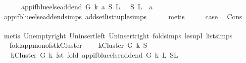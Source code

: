 \begin{isabellebody}
\ \ \ \ {\isacharbar}{\kern0pt}\ \ {\isachardoublequoteopen}{\isacharparenleft}{\kern0pt}app{\isacharunderscore}{\kern0pt}if{\isacharunderscore}{\kern0pt}blue{\isacharunderscore}{\kern0pt}else{\isacharunderscore}{\kern0pt}add{\isacharunderscore}{\kern0pt}end\ G\ k\ a\ {\isacharparenleft}{\kern0pt}S{\isacharcomma}{\kern0pt}\ L{}{\isacharparenright}{\kern0pt}{\isacharparenright}{\kern0pt}\ {\isacharequal}{\kern0pt}\ \ {\isacharparenleft}{\kern0pt}S{\isacharcomma}{\kern0pt}\ L{}\ {\isacharat}{\kern0pt}\ {\isacharbrackleft}{\kern0pt}a{\isacharbrackright}{\kern0pt}{\isacharparenright}{\kern0pt}{\isachardoublequoteclose}\isanewline
\ \ \ \ \isamarkupfalse%
\ app{\isacharunderscore}{\kern0pt}if{\isacharunderscore}{\kern0pt}blue{\isacharunderscore}{\kern0pt}else{\isacharunderscore}{\kern0pt}add{\isacharunderscore}{\kern0pt}end{\isachardot}{\kern0pt}simps\ add{\isacharunderscore}{\kern0pt}set{\isacharunderscore}{\kern0pt}list{\isacharunderscore}{\kern0pt}tuple{\isachardot}{\kern0pt}simps\isanewline
\ \ \ \ \isamarkupfalse%
\ metis\isanewline
\ \ \isamarkupfalse%
\ \isamarkupfalse%
\ {\isacharquery}{\kern0pt}case\ \isamarkupfalse%
\ Cons\isanewline
\ \ \ \ \isamarkupfalse%
\ {\isacharparenleft}{\kern0pt}metis\ Un{\isacharunderscore}{\kern0pt}empty{\isacharunderscore}{\kern0pt}right\ Un{\isacharunderscore}{\kern0pt}insert{\isacharunderscore}{\kern0pt}left\ Un{\isacharunderscore}{\kern0pt}insert{\isacharunderscore}{\kern0pt}right\ fold{\isacharunderscore}{\kern0pt}simps{\isacharparenleft}{\kern0pt}{}{\isacharparenright}{\kern0pt}\ le{\isacharunderscore}{\kern0pt}supI{}\ list{\isachardot}{\kern0pt}simps{\isacharparenleft}{\kern0pt}{}{}{\isacharparenright}{\kern0pt}{\isacharparenright}{\kern0pt}\ \ \ \ \ \ \isanewline
{}\isamarkupfalse%
%
\endisatagproof
{\isafoldproof}%
%
\isadelimproof
\isanewline
%
\endisadelimproof
\isanewline
\isanewline
{}\isamarkupfalse%
\ fold{\isacharunderscore}{\kern0pt}app{\isacharunderscore}{\kern0pt}mono{\isacharunderscore}{\kern0pt}fst{\isacharunderscore}{\kern0pt}kCluster{\isacharcolon}{\kern0pt}\ \isanewline
\ \ \ {\isachardoublequoteopen}kCluster\ G\ k\ S{\isachardoublequoteclose}\isanewline
\ \ \ {\isachardoublequoteopen}kCluster\ G\ k\ {\isacharparenleft}{\kern0pt}fst\ {\isacharparenleft}{\kern0pt}fold\ {\isacharparenleft}{\kern0pt}app{\isacharunderscore}{\kern0pt}if{\isacharunderscore}{\kern0pt}blue{\isacharunderscore}{\kern0pt}else{\isacharunderscore}{\kern0pt}add{\isacharunderscore}{\kern0pt}end\ G\ k{\isacharparenright}{\kern0pt}\ L{}\ {\isacharparenleft}{\kern0pt}S{\isacharcomma}{\kern0pt}L{}{\isacharparenright}{\kern0pt}{\isacharparenright}{\kern0pt}{\isacharparenright}{\kern0pt}{\isachardoublequoteclose}\ \isanewline

\end{isabellebody}
